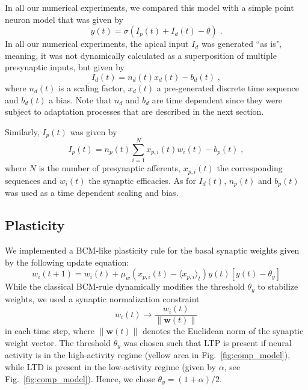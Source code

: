 \documentclass[10pt,a4paper,twocolumn]{article}
\begin{document}
		In all our numerical experiments, we compared this model with a 
		simple point neuron model that was given by
		\begin{equation}
			y(t) = \sigma\left(I_p(t) + I_d(t) - \theta \right) \; .
		\end{equation}
		In all our numerical experiments, the apical input $I_d$ was generated
		``as is", meaning, it was not dynamically calculated as a superposition
		of multiple presynaptic inputs, but given by
		\begin{equation}
			I_d(t) = n_d(t) x_d(t) - b_d(t) \; ,
			\label{eq:I_d}
		\end{equation}
		where $n_d(t)$ is a scaling factor, $x_d(t)$ a pre-generated
		discrete time sequence and $b_d(t)$ a bias. Note that $n_d$ and $b_d$ 
		are time dependent since they were subject to adaptation processes 
		that are described in the next section.
		
		Similarly, $I_p(t)$ was given by
		\begin{equation}
			I_p(t) = n_p(t) \sum_{i=1}^{N} x_{p,i}(t) w_i(t) - b_p(t) \; ,
		\end{equation}
		where $N$ is the number of presynaptic afferents, $x_{p,i}(t)$ the
		corresponding sequences and $w_i(t)$ the synaptic efficacies.
		As for $I_d(t)$, $n_p(t)$ and $b_p(t)$ was used as a time dependent
		scaling and bias.
		
		\subsection{Plasticity}
		
		We implemented a BCM-like plasticity rule for the basal 
		synaptic weights given by the following update equation:
		\begin{equation}
			w_i(t+1) = w_i(t) + \mu_w (x_{p,i}(t) - \langle x_{p,i}\rangle_t)
			y(t)\left[y(t) - \theta_y \right]
			\label{eq:bcm_plast}
		\end{equation}
		While the classical BCM-rule dynamically modifies the 
		threshold $\theta_y$ to stabilize weights, we used a
		synaptic normalization constraint
		\begin{equation}
			w_i(t) \rightarrow \frac{w_i(t)}{\lVert \mathbf{w}(t)\rVert}
		\end{equation}
		in each time step, where $\lVert \mathbf{w}(t)\rVert$ denotes the Euclidean
		norm of the synaptic weight vector. The threshold $\theta_y$ was
		chosen such that LTP is present if neural activity is in the
		high-activity regime (yellow area in Fig.~\ref{fig:comp_model}), while
		LTD is present in the low-activity regime 
		(given by $\alpha$, see Fig.~\ref{fig:comp_model}). Hence, we chose
		$\theta_y = (1+\alpha)/2$.
		
\end{document}
